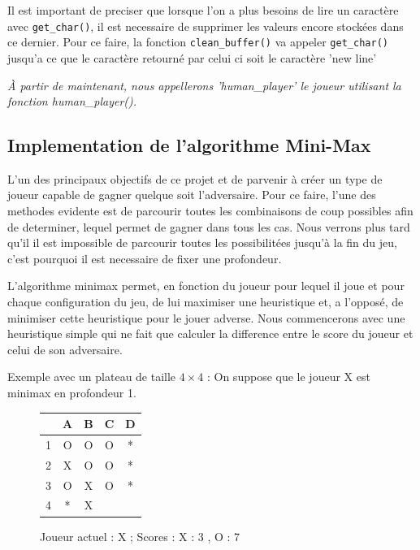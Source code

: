 \documentclass{report}
\begin{document}
Il est important de preciser que lorsque l'on a plus besoins de lire un caractère avec \texttt{get\_char()}, il est necessaire de supprimer les valeurs encore stockées dans ce dernier. Pour ce faire, la fonction \texttt{clean\_buffer()} va appeler \texttt{get\_char()} jusqu'a ce que le caractère retourné par celui ci soit le caractère 'new line'

\textit{À partir de maintenant, nous appellerons 'human\_player' le joueur utilisant la fonction human\_player().}


\subsection{Implementation de l'algorithme Mini-Max}
L'un des principaux objectifs de ce projet et de parvenir à créer un type de joueur capable de gagner quelque soit l'adversaire. Pour ce faire, l'une des methodes evidente est de parcourir toutes les combinaisons de coup possibles afin de determiner, lequel permet de gagner dans tous les cas. Nous verrons plus tard qu'il il est impossible de parcourir toutes les possibilitées jusqu'à la fin du jeu, c'est pourquoi il est necessaire de fixer une profondeur.

L'algorithme minimax permet, en fonction du joueur pour lequel il joue et pour chaque configuration du jeu, de lui maximiser une heuristique et, a l'opposé, de minimiser cette heuristique pour le jouer adverse.
Nous commencerons avec une heuristique simple qui ne fait que calculer la difference entre le score du joueur et celui de son adversaire.
\newline

Exemple avec un plateau de taille $4\times4$ :
On suppose que le joueur X est minimax en profondeur 1.

\begin{figure}[!h]
\begin{center}
\renewcommand{\arraystretch} {1.5}
    \begin{tabular}{c|c|c|c|c|}
          &A & B & C & D \\
        \hline
        1 & O & O & O & *\\
        \hline
        2 & X & O & O & * \\
        \hline
        3 & O & X & O & * \\
        \hline
        4 & * & X &  &  \\
        \hline
    \end{tabular}

\end{center}
\begin{center}
    \label{Figure 1}
    \caption{Joueur actuel : X ; Scores : X : 3 , O : 7}
\end{center}
\end{figure}
\end{document}
